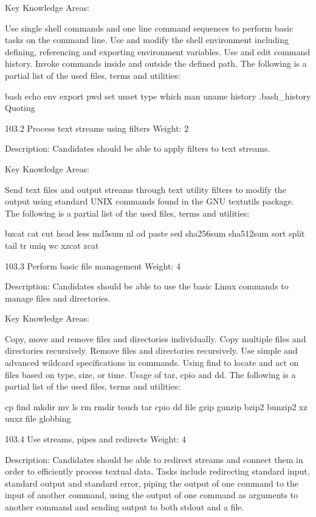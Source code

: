 Key Knowledge Areas:

Use single shell commands and one line command sequences to perform basic tasks on the command line.
Use and modify the shell environment including defining, referencing and exporting environment variables.
Use and edit command history.
Invoke commands inside and outside the defined path.
The following is a partial list of the used files, terms and utilities:

bash
echo
env
export
pwd
set
unset
type
which
man
uname
history
.bash_history
Quoting
 

103.2 Process text streams using filters
Weight: 2

Description: Candidates should be able to apply filters to text streams.

Key Knowledge Areas:

Send text files and output streams through text utility filters to modify the output using standard UNIX commands found in the GNU textutils package.
The following is a partial list of the used files, terms and utilities:

bzcat
cat
cut
head
less
md5sum
nl
od
paste
sed
sha256sum
sha512sum
sort
split
tail
tr
uniq
wc
xzcat
zcat
 

103.3 Perform basic file management
Weight: 4

Description: Candidates should be able to use the basic Linux commands to manage files and directories.

Key Knowledge Areas:

Copy, move and remove files and directories individually.
Copy multiple files and directories recursively.
Remove files and directories recursively.
Use simple and advanced wildcard specifications in commands.
Using find to locate and act on files based on type, size, or time.
Usage of tar, cpio and dd.
The following is a partial list of the used files, terms and utilities:

cp
find
mkdir
mv
ls
rm
rmdir
touch
tar
cpio
dd
file
gzip
gunzip
bzip2
bunzip2
xz
unxz
file globbing
 

103.4 Use streams, pipes and redirects
Weight: 4

Description: Candidates should be able to redirect streams and connect them in order to efficiently process textual data. Tasks include redirecting standard input, standard output and standard error, piping the output of one command to the input of another command, using the output of one command as arguments to another command and sending output to both stdout and a file.

